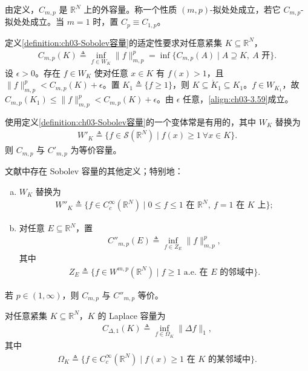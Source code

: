 \documentclass[../../main.tex]{subfiles}%
\begin{document}
由定义，$C_{m,p}$ 是 $\mathbb{R}^N$ 上的外容量。称一个性质 $(m,p)$-拟处处成立，若它 $C_{m,p}$-拟处处成立。当 $m=1$ 时，置 $C_p\equiv C_{1,p}$。

\begin{remark}\label{remark:ch03-容量定义适定}
定义\ref{definition:ch03-Sobolev容量}的适定性要求对任意紧集 $K\subseteq\mathbb{R}^N$，
\begin{align}
C_{m,p}(K)\triangleq \inf_{f\in W_K}\|f\|_{m,p}^p=\inf\{C_{m,p}(A)\mid A\supseteq K,\ A\text{ 开}\}.\label{align:ch03-3.59}
\end{align}
设 $\epsilon>0$。存在 $f\in W_K$ 使对任意 $x\in K$ 有 $f(x)>1$，且 $\|f\|_{m,p}^p<C_{m,p}(K)+\epsilon$。置 $K_1\triangleq \{f\geqslant1\}$，则 $K\subseteq\mathring K_1\subseteq K_1$。$f\in W_{K_1}$，故 $C_{m,p}(K_1)\leqslant\|f\|_{m,p}^p<C_{m,p}(K)+\epsilon$。由 $\epsilon$ 任意，\eqref{align:ch03-3.59}成立。
\end{remark}

使用定义\ref{definition:ch03-Sobolev容量}的一个变体常是有用的，其中 $W_K$ 替换为
\begin{align}
W'_K\triangleq \{f\in\mathcal{S}(\mathbb{R}^N)\mid f(x)\geqslant1\ \forall x\in K\}.\label{align:ch03-3.60}
\end{align}
则 $C_{m,p}$ 与 $C'_{m,p}$ 为等价容量。

\begin{remark}\label{remark:ch03-其他容量定义}
文献中存在 Sobolev 容量的其他定义；特别地：
\begin{enumerate}[(a)]
\item $W_K$ 替换为
\begin{align}
W''_K\triangleq \{f\in C^\infty_c(\mathbb{R}^N)\mid 0\leqslant f\leqslant1\text{ 在 }\mathbb{R}^N,\ f=1\text{ 在 }K\text{ 上}\};\label{align:ch03-3.61}
\end{align}
\item 对任意 $E\subseteq\mathbb{R}^N$，置
\begin{align}
C''_{m,p}(E)\triangleq \inf_{f\in Z_E}\|f\|_{m,p}^p,\label{align:ch03-3.62a}
\end{align}
其中
\begin{align}
Z_E\triangleq \{f\in W^{m,p}(\mathbb{R}^N)\mid f\geqslant1\text{ a.e. 在 }E\text{ 的邻域中}\}.\label{align:ch03-3.62b}
\end{align}
\end{enumerate}
若 $p\in(1,\infty)$，则 $C_{m,p}$ 与 $C''_{m,p}$ 等价。
\end{remark}

\begin{definition}\label{definition:ch03-Laplacian容量}
对任意紧集 $K\subseteq\mathbb{R}^N$，$K$ 的 Laplace 容量为
\begin{align}
C_{\Delta,1}(K)\triangleq \inf_{f\in\Omega_K}\|\Delta f\|_1,\label{align:ch03-3.63a}
\end{align}
其中
\begin{align}
\Omega_K\triangleq \{f\in C^\infty_c(\mathbb{R}^N)\mid f(x)\geqslant1\text{ 在 }K\text{ 的某邻域中}\}.\label{align:ch03-3.63b}
\end{align}
\end{definition}
\end{document}
